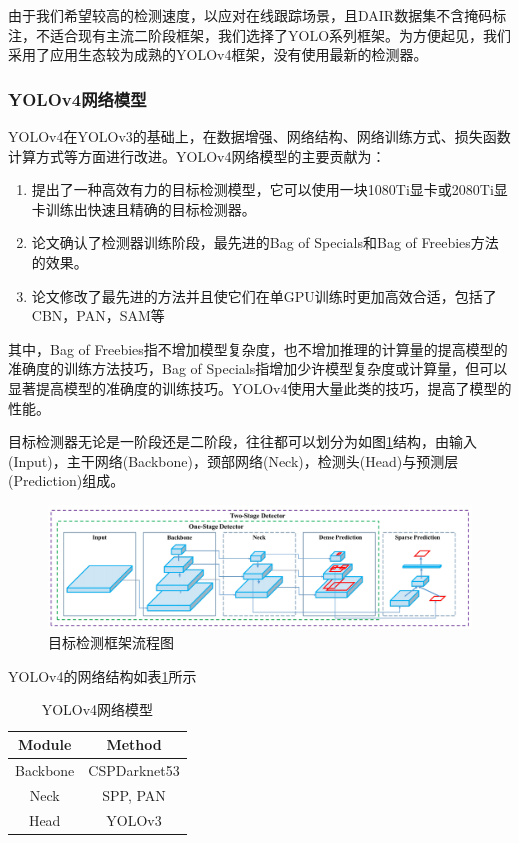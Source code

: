 由于我们希望较高的检测速度，以应对在线跟踪场景，且DAIR数据集不含掩码标注，不适合现有主流二阶段框架，我们选择了YOLO系列框架。为方便起见，我们采用了应用生态较为成熟的YOLOv4框架，没有使用最新的检测器。

\subsubsection{YOLOv4网络模型}

YOLOv4在YOLOv3的基础上，在数据增强、网络结构、网络训练方式、损失函数计算方式等方面进行改进。YOLOv4网络模型的主要贡献为：

\begin{enumerate}
    \item 提出了一种高效有力的目标检测模型，它可以使用一块1080Ti显卡或2080Ti显卡训练出快速且精确的目标检测器。
    \item 论文确认了检测器训练阶段，最先进的Bag of Specials和Bag of Freebies方法的效果。
    \item 论文修改了最先进的方法并且使它们在单GPU训练时更加高效合适，包括了CBN，PAN，SAM等
\end{enumerate}

其中，Bag of Freebies指不增加模型复杂度，也不增加推理的计算量的提高模型的准确度的训练方法技巧，Bag of Specials指增加少许模型复杂度或计算量，但可以显著提高模型的准确度的训练技巧。YOLOv4使用大量此类的技巧，提高了模型的性能。

目标检测器无论是一阶段还是二阶段，往往都可以划分为如图\ref{fig21}结构，由输入(Input)，主干网络(Backbone)，颈部网络(Neck)，检测头(Head)与预测层(Prediction)组成。

\begin{figure}[htb] 
    \center
    \includegraphics[width=\textwidth]{figure/fig21.png}
    \caption{目标检测框架流程图\cite{bochkovskiy2020yolov4}}
    \label{fig21}
\end{figure}

YOLOv4的网络结构如表\ref{table6}所示

\begin{table}[htbp]
    \centering
    \caption{YOLOv4网络模型}
    \begin{tabular}{c c}
    \toprule
    Module & Method \\
    \midrule
    Backbone & CSPDarknet53 \\
    Neck & SPP, PAN \\
    Head & YOLOv3 \\
    \bottomrule
    \end{tabular}
    \label{table6}
\end{table}

